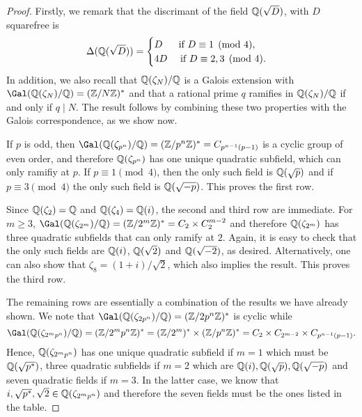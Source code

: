 \begin{proof}
    Firstly, we remark that the discrimant of the field $\mathbb{Q}(\sqrt{D})$, with $D$ squarefree is
    \begin{equation}
        \Delta(\mathbb{Q}(\sqrt{D}))=
        \begin{cases}
            D \ \quad\text{  if } D\equiv1\pmod{4},\\
            4D \quad\text{ if } D\equiv2,3\pmod{4}.
        \end{cases}
    \end{equation}
    In addition, we also recall that $\mathbb{Q}(\zeta_N)/\mathbb{Q}$ is a Galois extension with $\Gal(\QQ(\zeta_N)/\QQ)=(\ZZ/N\ZZ)^*$ and that a rational prime $q$ ramifies in $\mathbb{Q}(\zeta_N)/\mathbb{Q}$ if and only if $q\mid N$. The result follows by combining these two properties with the Galois correspondence, as we show now.

    If $p$ is odd, then $\Gal(\QQ(\zeta_{p^n})/\QQ)=(\ZZ/p^n\ZZ)^*=C_{p^{n-1}(p-1)}$ is a cyclic group of even order, and therefore $\mathbb{Q}(\zeta_{p^n})$ has one unique quadratic subfield, which can only ramifiy at $p$. If $p\equiv1\pmod{4}$, then the only such field is $\mathbb{Q}(\sqrt{p})$ and if $p\equiv3\pmod{4}$ the only such field is $\mathbb{Q}(\sqrt{-p})$. This proves the first row. 

    Since $\mathbb{Q}(\zeta_2)=\mathbb{Q}$ and $\mathbb{Q}(\zeta_4)=\mathbb{Q}(i)$, the second and third row are immediate. For $m\geq3$, $\Gal(\QQ(\zeta_{2^m})/\QQ)=(\ZZ/2^m\ZZ)^*=C_2\times C_2^{m-2}$ and therefore $\mathbb{Q}(\zeta_{2^m})$ has three quadratic subfields that can only ramify at $2$. Again, it is easy to check that the only such fields are $\mathbb{Q}(i)$, $\mathbb{Q}(\sqrt{2})$ and $\mathbb{Q}(\sqrt{-2})$, as desired. Alternatively, one can also show that $\zeta_8=(1+i)/\sqrt{2}$, which also implies the result. This proves the third row.

    The remaining rows are essentially a combination of the results we have already shown. We note that $\Gal(\QQ(\zeta_{2p^n})/\QQ)=(\ZZ/2p^n\ZZ)^*$ is cyclic while $$\Gal(\QQ(\zeta_{2^mp^n})/\QQ)=(\ZZ/2^mp^n\ZZ)^*=(\ZZ/2^m)^*\times(\ZZ/p^n\ZZ)^*=C_2\times C_{2^{m-2}}\times C_{p^{n-1}(p-1)}.$$
    Hence, $\mathbb{Q}(\zeta_{2^mp^n})$ has one unique quadratic subfield if $m=1$ which must be $\mathbb{Q}(\sqrt{p^*})$, three quadratic subfields if $m=2$ which are $\mathbb{Q}(i),\mathbb{Q}(\sqrt{p}),\mathbb{Q}(\sqrt{-p})$ and seven quadratic fields if $m=3$. In the latter case, we know that $i,\sqrt{p^*},\sqrt{2}\in\mathbb{Q}(\zeta_{2^mp^n})$ and therefore the seven fields must be the ones listed in the table.

\end{proof}


